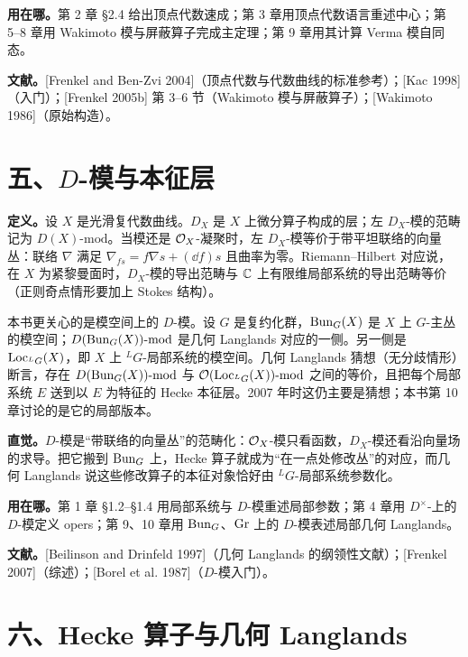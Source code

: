 \textbf{用在哪。}第 2 章 §2.4 给出顶点代数速成；第 3 章用顶点代数语言重述中心；第 5–8 章用 Wakimoto 模与屏蔽算子完成主定理；第 9 章用其计算 Verma 模自同态。

\textbf{文献。}[Frenkel and Ben-Zvi 2004]（顶点代数与代数曲线的标准参考）；[Kac 1998]（入门）；[Frenkel 2005b] 第 3–6 节（Wakimoto 模与屏蔽算子）；[Wakimoto 1986]（原始构造）。

\section*{五、$D$-模与本征层}

\textbf{定义。}设 $X$ 是光滑复代数曲线。$D_X$ 是 $X$ 上微分算子构成的层；左 $D_X$-模的范畴记为 $D(X)\text{-}\mathrm{mod}$。当模还是 $\mathcal{O}_X$-凝聚时，左 $D_X$-模等价于带平坦联络的向量丛：联络 $\nabla$ 满足 $\nabla_{f s}=f\nabla s+(\dd f)s$ 且曲率为零。Riemann--Hilbert 对应说，在 $X$ 为紧黎曼面时，$D_X$-模的导出范畴与 $\mathbb{C}$ 上有限维局部系统的导出范畴等价（正则奇点情形要加上 Stokes 结构）。

本书更关心的是模空间上的 $D$-模。设 $G$ 是复约化群，$\operatorname{Bun}_G(X)$ 是 $X$ 上 $G$-主丛的模空间；$D(\operatorname{Bun}_G(X))\text{-}\mathrm{mod}$ 是几何 Langlands 对应的一侧。另一侧是 $\operatorname{Loc}_{{}^L G}(X)$，即 $X$ 上 ${}^L G$-局部系统的模空间。几何 Langlands 猜想（无分歧情形）断言，存在 $D(\operatorname{Bun}_G(X))\text{-}\mathrm{mod}$ 与 $\mathcal{O}(\operatorname{Loc}_{{}^L G}(X))\text{-}\mathrm{mod}$ 之间的等价，且把每个局部系统 $E$ 送到以 $E$ 为特征的 Hecke 本征层。2007 年时这仍主要是猜想；本书第 10 章讨论的是它的局部版本。

\textbf{直觉。}$D$-模是“带联络的向量丛”的范畴化：$\mathcal{O}_X$-模只看函数，$D_X$-模还看沿向量场的求导。把它搬到 $\operatorname{Bun}_G$ 上，Hecke 算子就成为“在一点处修改丛”的对应，而几何 Langlands 说这些修改算子的本征对象恰好由 ${}^L G$-局部系统参数化。

\textbf{用在哪。}第 1 章 §1.2–§1.4 用局部系统与 $D$-模重述局部参数；第 4 章用 $D^\times$-上的 $D$-模定义 opers；第 9、10 章用 $\operatorname{Bun}_G$、$\operatorname{Gr}$ 上的 $D$-模表述局部几何 Langlands。

\textbf{文献。}[Beilinson and Drinfeld 1997]（几何 Langlands 的纲领性文献）；[Frenkel 2007]（综述）；[Borel et al. 1987]（$D$-模入门）。

\section*{六、Hecke 算子与几何 Langlands}

